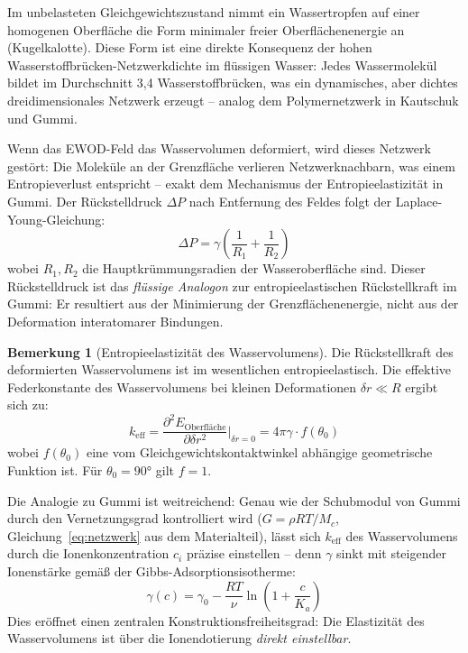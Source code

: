 ﻿\documentclass[a4paper,12pt]{scrreprt}
\theoremstyle{definition}
\newtheorem{bemerkung}{Bemerkung}[section]
\begin{document}
Im unbelasteten Gleichgewichtszustand nimmt ein Wassertropfen auf einer
homogenen Oberfläche die Form minimaler freier Oberflächenenergie an
(Kugelkalotte). Diese Form ist eine direkte Konsequenz der hohen
Wasserstoffbrücken-Netzwerkdichte im flüssigen Wasser: Jedes
Wassermolekül bildet im Durchschnitt 3,4 Wasserstoffbrücken, was ein
dynamisches, aber dichtes dreidimensionales Netzwerk erzeugt -- analog
dem Polymernetzwerk in Kautschuk und Gummi.

Wenn das EWOD-Feld das Wasservolumen deformiert, wird dieses Netzwerk
gestört: Die Moleküle an der Grenzfläche verlieren Netzwerknachbarn,
was einem Entropieverlust entspricht -- exakt dem Mechanismus der
Entropieelastizität in Gummi. Der Rückstelldruck $\Delta P$ nach
Entfernung des Feldes folgt der Laplace-Young-Gleichung:
\begin{equation}
	\Delta P = \gamma \left(\frac{1}{R_1} + \frac{1}{R_2}\right)
	\label{eq:laplace_rueckstell}
\end{equation}
wobei $R_1, R_2$ die Hauptkrümmungsradien der Wasseroberfläche sind.
Dieser Rückstelldruck ist das \emph{flüssige Analogon} zur entropieelastischen
Rückstellkraft im Gummi: Er resultiert aus der Minimierung der
Grenzflächenenergie, nicht aus der Deformation interatomarer Bindungen.

\begin{bemerkung}[Entropieelastizität des Wasservolumens]
	Die Rückstellkraft des deformierten Wasservolumens ist im wesentlichen
	entropieelastisch. Die effektive Federkonstante des Wasservolumens bei
	kleinen Deformationen $\delta r \ll R$ ergibt sich zu:
	\begin{equation}
		k_{\mathrm{eff}} = \frac{\partial^2 E_{\mathrm{Oberfläche}}}{\partial \delta r^2}
		\bigg|_{\delta r = 0}
		= 4\pi \gamma \cdot f(\theta_0)
		\label{eq:federkonst_wasser}
	\end{equation}
	wobei $f(\theta_0)$ eine vom Gleichgewichtskontaktwinkel abhängige
	geometrische Funktion ist. Für $\theta_0 = 90 °$ gilt $f = 1$.
\end{bemerkung}

Die Analogie zu Gummi ist weitreichend: Genau wie der Schubmodul von
Gummi durch den Vernetzungsgrad kontrolliert wird
($G = \rho R T / M_c$, Gleichung~\eqref{eq:netzwerk} aus dem
Materialteil), lässt sich $k_{\mathrm{eff}}$ des Wasservolumens durch
die Ionenkonzentration $c_i$ präzise einstellen -- denn $\gamma$
sinkt mit steigender Ionenstärke gemäß der Gibbs-Adsorptionsisotherme:
\begin{equation}
	\gamma(c) = \gamma_0 - \frac{RT}{\nu} \ln\left(1 + \frac{c}{K_a}\right)
	\label{eq:gibbs_adsorption}
\end{equation}
Dies eröffnet einen zentralen Konstruktionsfreiheitsgrad: Die Elastizität
des Wasservolumens ist über die Ionendotierung \emph{direkt einstellbar}.
\end{document}
